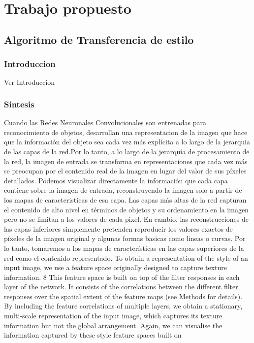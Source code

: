 \documentclass[a4paper,10pt]{article}
\begin{document}
\section{Trabajo propuesto}
  \subsection{Algoritmo de Transferencia de estilo}
    \subsubsection{Introduccion}
    Ver Introduccion 
    \subsubsection{Sintesis}
      Cuando las Redes Neuronales Convolucionales son entrenadas para reconocimiento de objetos, desarrollan una representacion de la imagen que hace que la información 
      del objeto sea cada vez más explícita a lo largo de la jerarquia de las capas de la red.Por lo tanto, a lo largo de la jerarquía de procesamiento de la red, 
      la imagen de entrada se transforma en representaciones que cada vez más se preocupan por el contenido real de la imagen en lugar del valor de sus píxeles detallados. 
      Podemos visualizar directamente la información que cada capa contiene sobre la imagen de entrada, reconstruyendo la imagen solo a partir de los mapas de caracteristicas
      de esa capa. Las capas más altas de la red capturan el contenido de alto nivel en términos de objetos y su ordenamiento en la imagen pero no se limitan a los valores de cada 
      pixel. En  cambio, las reconstrucciones de las capas inferiores simplemente pretenden reproducir los valores exactos de píxeles de la imagen original y algunas formas
      basicas como lineas o curvas. Por lo tanto, tomaremos a los mapas de características en las capas superiores de la red como el contenido representado.
      To obtain a representation of the style of an input image, we use a feature space originally
designed to capture texture information. 8 This feature space is built on top of the filter responses
in each layer of the network. It consists of the correlations between the different filter responses
over the spatial extent of the feature maps (see Methods for details). By including the feature
correlations of multiple layers, we obtain a stationary, multi-scale representation of the input
image, which captures its texture information but not the global arrangement.
Again, we can visualise the information captured by these style feature spaces built on
\end{document}
